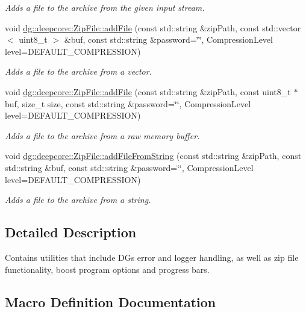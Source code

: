 \begin{DoxyCompactItemize}
\begin{DoxyCompactList}\small\item\em Adds a file to the archive from the given input stream. \end{DoxyCompactList}\item 
void \hyperlink{group___utility_module_gafb1c01f849fc0fc4b33e33285cd39cf5}{dg\+::deepcore\+::\+Zip\+File\+::add\+File} (const std\+::string \&zip\+Path, const std\+::vector$<$ uint8\+\_\+t $>$ \&buf, const std\+::string \&password=\char`\"{}\char`\"{}, Compression\+Level level=D\+E\+F\+A\+U\+L\+T\+\_\+\+C\+O\+M\+P\+R\+E\+S\+S\+I\+ON)
\begin{DoxyCompactList}\small\item\em Adds a file to the archive from a vector. \end{DoxyCompactList}\item 
void \hyperlink{group___utility_module_gaffadeb76614f94276dc5631a7f2f3a7a}{dg\+::deepcore\+::\+Zip\+File\+::add\+File} (const std\+::string \&zip\+Path, const uint8\+\_\+t $\ast$buf, size\+\_\+t size, const std\+::string \&password=\char`\"{}\char`\"{}, Compression\+Level level=D\+E\+F\+A\+U\+L\+T\+\_\+\+C\+O\+M\+P\+R\+E\+S\+S\+I\+ON)
\begin{DoxyCompactList}\small\item\em Adds a file to the archive from a raw memory buffer. \end{DoxyCompactList}\item 
void \hyperlink{group___utility_module_gad85b99f9708af55dfb3074e9a0a50cf3}{dg\+::deepcore\+::\+Zip\+File\+::add\+File\+From\+String} (const std\+::string \&zip\+Path, const std\+::string \&buf, const std\+::string \&password=\char`\"{}\char`\"{}, Compression\+Level level=D\+E\+F\+A\+U\+L\+T\+\_\+\+C\+O\+M\+P\+R\+E\+S\+S\+I\+ON)
\begin{DoxyCompactList}\small\item\em Adds a file to the archive from a string. \end{DoxyCompactList}\end{DoxyCompactItemize}


\subsection{Detailed Description}
Contains utilities that include DG\textquotesingle{}s error and logger handling, as well as zip file functionality, boost program options and progress bars. 



\subsection{Macro Definition Documentation}
